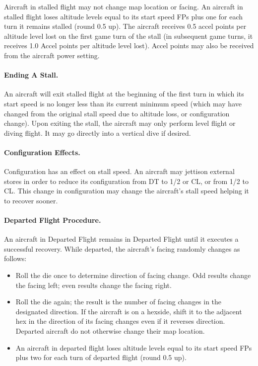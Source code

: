 Aircraft in stalled flight may not change map location or facing. An aircraft in stalled flight loses altitude levels equal to its start speed FPs plus one for each turn it remains stalled (round 0.5 up). The aircraft receives 0.5 accel points per altitude level lost on the first game turn of the stall (in subsequent game turns, it receives 1.0 Accel points per altitude level lost). Accel points may also be received from the aircraft power setting.

\paragraph{Ending A Stall.} 
An aircraft will exit stalled flight at the beginning of the first turn in which its start speed is no longer less than its current minimum speed (which may have changed from the original stall speed due to altitude loss, or configuration change). Upon exiting the stall, the aircraft may only perform level flight or diving flight. It may go directly into a vertical dive if desired.  

\paragraph{Configuration Effects.}
Configuration has an effect on stall speed. An aircraft may jettison external stores in order to reduce its configuration from DT to 1/2 or CL, or from 1/2 to CL. This change in configuration may change the aircraft's stall speed helping it to recover sooner.

\paragraph{Departed Flight Procedure.} 
An aircraft in Departed Flight remains in Departed Flight until it executes a successful recovery. While departed, the aircraft's facing randomly changes as follows:

\begin{itemize}

    \item Roll the die once to determine direction of facing change. Odd results change the facing left; even results change the facing right.

    \item Roll the die again; the result is the number of facing changes in the designated direction. If the aircraft is on a hexside, shift it to the adjacent hex in the direction of its facing changes even if it reverses direction. Departed aircraft do not otherwise change their map location.

    \item An aircraft in departed flight loses altitude levels equal to its start speed FPs plus two for each turn of departed flight (round 0.5 up).

\end{itemize}

